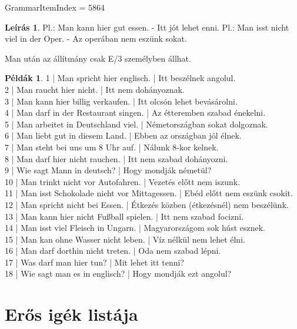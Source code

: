 \documentclass{article}
\theoremstyle{definition}
\newtheorem*{exmp}{Példák}
\newtheorem*{desc}{Leírás}
\begin{document}
GrammarItemIndex = 5864

\begin{desc}
Pl.: Man kann hier gut essen. - Itt jót lehet enni.
Pl.: Man isst nicht viel in der Oper. - Az operában nem eszünk sokat. 

Man után az állítmány csak E/3 személyben állhat.
\end{desc}

\begin{exmp}
1 | Man spricht hier englisch. | Itt beszélnek angolul.\\
2 | Man raucht hier nicht. | Itt nem dohányoznak.\\
3 | Man kann hier billig verkaufen. | Itt olcsón lehet bevásárolni.\\
4 | Man darf in der Restaurant singen. | Az étteremben szabad énekelni.\\
5 | Man arbeitet in Deutschland viel. | Németországban sokat dolgoznak.\\
6 | Man liebt gut in diesem Land. | Ebben az országban jól élnek.\\
7 | Man steht bei uns um 8 Uhr auf. | Nálunk 8-kor kelnek.\\
8 | Man darf hier nicht rauchen. | Itt nem szabad dohányozni.\\
9 | Wie sagt Mann in deutsch? | Hogy mondják németül?\\
10 | Man trinkt nicht vor Autofahren. | Vezetés előtt nem iszunk.\\
11 | Man isst Schokolade nicht vor Mittagessen. | Ebéd előtt nem eszünk csokit.\\
12 | Man spricht nicht bei Essen. | Étkezés közben (étkezésnél) nem beszélünk.\\
13 | Man kann hier nicht Fußball spielen. | Itt nem szabad focizni.\\
14 | Man isst viel Fleisch in Ungarn. | Magyarországom sok húst esznek.\\
15 | Man kan ohne Wasser nicht leben. | Víz nélkül nem lehet élni.\\
16 | Man darf dorthin nicht treten. | Oda nem szabad lépni.\\
17 | Was darf man hier tun? | Mit lehet itt tenni?\\
18 | Wie sagt man es in englisch? | Hogy mondják ezt angolul?\\
\end{exmp}

\section{Erős igék listája}
\end{document}

